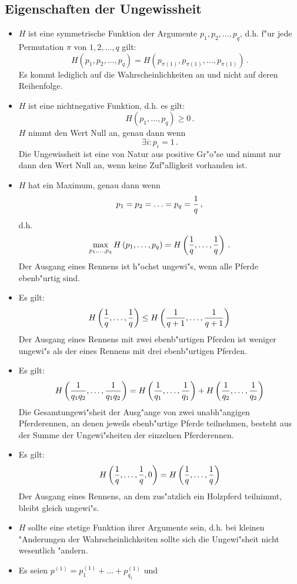 \documentclass[10pt]{article}
\begin{document}
\subsection*{Eigenschaften der Ungewissheit}
\begin{itemize}
  \item[E1] $H$ ist eine symmetrische Funktion der Argumente 
    $p_1,p_2,\ldots,p_q$, d.h. 
    f"ur jede Permutation $\pi$ von $1,2,\ldots,q$ gilt:
    $$  H(p_1,p_2,\ldots,p_q)=H(p_{\pi(1)},p_{\pi(1)},\ldots,p_{\pi(1)})\,. $$
    Es kommt lediglich auf die Wahrscheinlichkeiten an und nicht auf deren
    Reihenfolge.
  \item[E2] $H$ ist eine nichtnegative Funktion, d.h. es gilt:
    $$ H(p_1,\ldots,p_q)\ge 0\,. $$
    $H$ nimmt den Wert Null an, genau dann wenn
    $$ \exists i : p_i=1 \,. $$
    Die Ungewissheit ist eine von Natur aus positive Gr"o"se und nimmt nur
    dann den Wert Null an, wenn keine Zuf"alligkeit vorhanden ist.
  \item[E3] $H$ hat ein Maximum, genau dann wenn
    $$ p_1=p_2=\ldots =p_q={1\over q} \, , $$
    d.h.
    $$ \max_{p_1,\ldots,p_q} H\left(p_1,\ldots,p_q\right) = 
       H\left({1\over q},\ldots,{1\over q}\right) \, . $$
    Der Ausgang eines Rennens ist h"ochst ungewi"s, wenn alle Pferde
    ebenb"urtig sind.
  \item[E4] Es gilt:
    $$ H\left({1\over q},\ldots,{1\over q}\right) \le 
       H\left({1\over q+1},\ldots,{1\over q+1}\right) $$
    Der Ausgang eines Rennens mit zwei ebenb"urtigen Pferden ist weniger
    ungewi"s als der eines Rennens mit drei ebenb"urtigen Pferden.
  \item[E5] Es gilt:
    $$ H\left({1\over q_1 q_2},\ldots,{1\over q_1 q_2}\right) =
       H\left({1\over q_1},\ldots,{1\over q_1}\right) + 
       H\left({1\over q_2},\ldots,{1\over q_2}\right) $$
    Die Gesamtungewi"sheit der Ausg"ange von zwei unabh"angigen Pferderennen,
    an denen jeweils ebenb"urtige Pferde teilnehmen, besteht aus der Summe der
    Ungewi"sheiten der einzelnen Pferderennen.
  \item[E6] Es gilt:
    $$ H\left({1\over q},\ldots,{1\over q},0\right) = 
       H\left({1\over q},\ldots,{1\over q}\right)$$
    Der Ausgang eines Rennens, an dem zus"atzlich ein Holzpferd teilnimmt,
    bleibt gleich ungewi"s.
  \item[E7] $H$ sollte eine stetige Funktion ihrer Argumente sein, d.h. bei
    kleinen "Anderungen der Wahrscheinlichkeiten sollte sich die
    Ungewi"sheit nicht wesentlich "andern.
  \item[E8] Es seien $p^{(1)}=p^{(1)}_1+\ldots +p^{(1)}_{q_1}$ und

\end{itemize}
\end{document}
